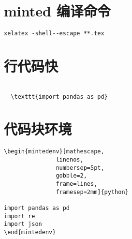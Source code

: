 \documentclass[a4paper]{ctexart}    %
\begin{document}
\section{minted 编译命令}

\begin{verbatim}
xelatex -shell--escape **.tex
\end{verbatim}

\section{行代码快}
\begin{verbatim}

  \texttt{import pandas as pd}
\end{verbatim}
\section{代码块环境}
\begin{verbatim}
\begin{mintedenv}[mathescape,
               linenos,
               numbersep=5pt,
               gobble=2,
               frame=lines,
               framesep=2mm]{python}

import pandas as pd
import re
import json
\end{mintedenv}

\end{verbatim}
\end{document}
